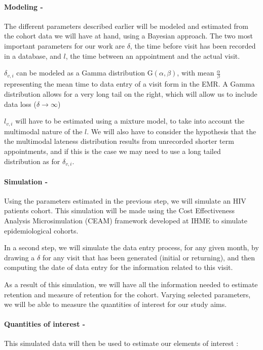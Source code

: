 \paragraph{Modeling -} The different parameters described earlier will be modeled and estimated  from the cohort data we will have at hand, using a Bayesian approach. The two most important parameters for our work are $\delta$, the time before visit has been recorded in a database, and $l$, the time between an appointment and the actual visit.

$\delta_{v,i}$ can be modeled as a Gamma distribution $\mathrm{G}(\alpha , \beta)$, with mean $\frac{\alpha}{\beta}$ representing the mean time to data entry of a visit form in the EMR. A Gamma distribution allows for a very long tail on the right, which will allow us to include data loss ($\delta  \rightarrow  \infty$)

$l_{v,i}$ will have to be estimated using a mixture model, to take into account the multimodal nature of the $l$. We will also have to consider the hypothesis that the the multimodal lateness distribution results from unrecorded shorter term appointments, and if this is the case we may need to use a long tailed distribution as for $\delta_{v,i}$.

\paragraph{Simulation - } Using the parameters estimated in the previous step, we will simulate an HIV patients cohort. This simulation will be made using the Cost Effectiveness Analysis Microsimulation (CEAM) framework developed at IHME to simulate epidemiological cohorts.

In a second step, we will simulate the data entry process, for any given month, by drawing a $\delta$ for any  visit that has been generated (initial or returning), and then computing the date of data entry for the information related to this visit.

As a result of this simulation, we will have all the information needed to estimate retention and measure of retention for the cohort. Varying selected parameters, we will be able to measure the quantities of interest for our study aims.


\paragraph{Quantities of interest -} This simulated data will then be used to estimate our elements of interest :

